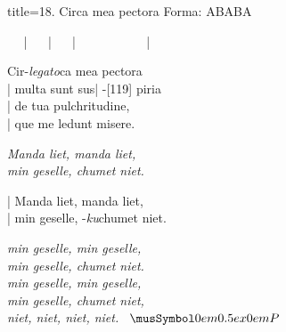 \begin{song}{title={18. Circa mea pectora}}
Forma: ABABA

\nopagebreak
\vspace{0.7\baselineskip}

\startline {} ~\wholerest ~ | ~\wholerest ~ | ~\wholerest ~ | ~\wholerest ~  ~\wholerest ~  ~\wholerest ~  ~\wholerest ~ |\\

\vspace{0.7\baselineskip}
\nopagebreak
\vspace{0.7\baselineskip}

\begin{keepverse}
  \startline{} Cir\chord-{\emph{legato}}ca mea pectora\\
  \startline| multa sunt sus| \chord-{[119]} piria\\
  \startline| de tua pulchritudine,\\
  \startline| que me ledunt misere.\\
\end{keepverse}

\nopagebreak
\vspace{0.7\baselineskip}
\begin{keepverse}
\emph{Manda liet, manda liet,\\
min geselle, chumet niet.}\\
\end{keepverse}

\nopagebreak

\begin{keepverse}
  \startline{}| Manda liet, manda liet,\\
  \startline| min geselle, \chord-{\emph{ku}}chumet niet.\\
\end{keepverse}

\nopagebreak
\vspace{0.7\baselineskip}
\begin{keepverse}
\emph{min geselle, min geselle,\\
min geselle, chumet niet.\\
min geselle, min geselle,\\
min geselle, chumet niet,\\
niet, niet, niet, niet. ~$\musFermata$}\\
\end{keepverse}


\end{song}
